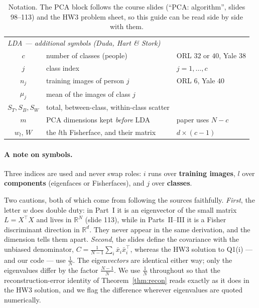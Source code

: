 \documentclass[11pt]{article}
\theoremstyle{definition}
\theoremstyle{remark}
\newcommand{\Sw}{S_W}
\newcommand{\Sb}{S_B}
\newcommand{\St}{S_T}
\newcommand{\R}{\mathbb{R}}
\begin{document}
\begin{table}[htbp]
\begin{tabular}{cll}
\midrule
\multicolumn{3}{l}{\emph{LDA --- additional symbols (Duda, Hart \& Stork)}}\\
$c$                & number of classes (people)               & ORL $32$ or $40$, Yale $38$ \\
$j$                & class index                              & $j = 1,\dots,c$ \\
$n_j$              & training images of person $j$            & ORL $6$, Yale $40$ \\
$\mu_j$            & mean of the images of class $j$          & \\
$\St,\Sb,\Sw$      & total, between-class, within-class scatter & \\
$m$                & PCA dimensions kept \emph{before} LDA    & paper uses $N-c$ \\
$w_l$, $W$         & the $l$th Fisherface, and their matrix   & $d\times(c-1)$ \\
\bottomrule
\end{tabular}
\caption{Notation. The PCA block follows the course slides (``PCA: algorithm'',
slides 98--113) and the HW3 problem sheet, so this guide can be read side by side
with them.}
\label{tab:notation}
\end{table}

\paragraph{A note on symbols.} Three indices are used and never swap roles: $i$
runs over \textbf{training images}, $l$ over \textbf{components} (eigenfaces or
Fisherfaces), and $j$ over \textbf{classes}.

Two cautions, both of which come from following the sources faithfully.
\emph{First}, the letter $w$ does double duty: in Part~I it is an eigenvector of
the small matrix $L=X^{\!\top}\!X$ and lives in $\R^N$ (slide 113), while in
Parts~II--III it is a Fisher discriminant direction in $\R^d$. They never appear
in the same derivation, and the dimension tells them apart.
\emph{Second}, the slides define the covariance with the unbiased denominator,
$C=\frac{1}{N-1}\sum_i \bar{x}_i\bar{x}_i^{\!\top}$, whereas the HW3 solution to
Q1(i) --- and our code --- use $\frac{1}{N}$. The eigen\emph{vectors} are
identical either way; only the eigenvalues differ by the factor
$\tfrac{N-1}{N}$. We use $\frac{1}{N}$ throughout so that the reconstruction-error
identity of Theorem~\ref{thm:recon} reads exactly as it does in the HW3 solution,
and we flag the difference wherever eigenvalues are quoted numerically.
\end{document}
